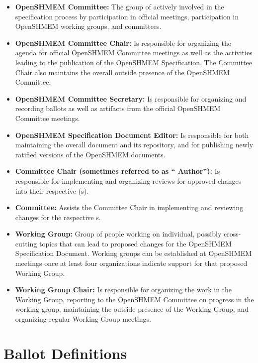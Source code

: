 \begin{itemize}
\item {\bf OpenSHMEM Committee:} The group of
  actively involved in the
  specification process by participation in official meetings,
  participation in OpenSHMEM working groups, and  committees.
\item {\bf OpenSHMEM Committee Chair:} Is responsible for organizing the agenda
  for official OpenSHMEM Committee meetings as well as the activities leading to the
  publication of the OpenSHMEM Specification. The Committee
  Chair also maintains the overall outside presence of the OpenSHMEM Committee.
\item {\bf OpenSHMEM Committee Secretary:} Is responsible for organizing and
  recording ballots as well as artifacts from the official OpenSHMEM Committee
  meetings.
\item {\bf OpenSHMEM Specification Document Editor:} Is responsible for both
  maintaining the overall document and its repository, and for
  publishing newly ratified versions of the OpenSHMEM documents.
\item {\bf {} Committee Chair (sometimes referred to as ``
  Author''):} Is responsible for implementing and organizing reviews
  for approved changes into their respective (s).
\item {\bf {} Committee:} Assists the  Committee Chair in
  implementing and reviewing changes for the respective s.
\item {\bf Working Group:} Group of people working on individual,
  possibly cross-cutting topics that can lead to proposed changes for
  the OpenSHMEM Specification Document. Working groups can be established at OpenSHMEM
  meetings once at least four organizations indicate
  support for that proposed Working Group.
\item {\bf Working Group Chair:} Is responsible for organizing the
  work in the Working Group, reporting to the OpenSHMEM Committee on progress in
  the working group, maintaining the outside presence of the Working
  Group, and organizing regular Working Group meetings.
\end{itemize}

\section{Ballot Definitions}

